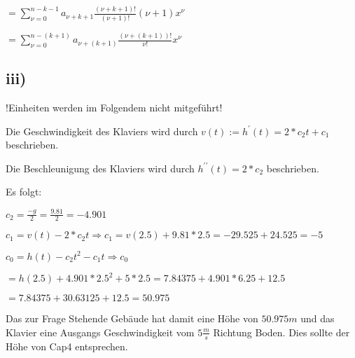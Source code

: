 $ = \sum\limits^{n-k-1}_{\nu=0} a_{\nu+k+1} \frac{(\nu+k+1)!}{(\nu+1)!} (\nu+1)x^{\nu}$

$ = \sum\limits^{n -(k+1)}_{\nu=0} a_{\nu+(k+1)} \frac{(\nu+(k+1))!}{\nu!} x^{\nu}$


\pagebreak
\subsection*{iii)}

\begin{large}
!Einheiten werden im Folgendem nicht mitgeführt!
\end{large}

Die Geschwindigkeit des Klaviers wird durch $v(t) := h^{\prime}(t) = 2 * c_{2}t + c_{1}$ beschrieben.

Die Beschleunigung des Klaviers wird durch $h^{\prime\prime}(t) = 2 * c_{2}$ beschrieben.

Es folgt:

$c_{2} = \frac{-g}{2} = \frac{9.81}{2} = -4.901 $

$c_{1} = v(t) - 2*c_{2}t \Longrightarrow c_{1} = v(2.5) + 9.81*2.5 = -29.525 + 24.525 = -5$

$c_{0} = h(t) - c_{2}t^{2} - c_{1}t \Longrightarrow c_{0}$

$= h(2.5) + 4.901 * 2.5^{2} + 5 * 2.5 = 7.84375 + 4.901 * 6.25 + 12.5$
 
$ = 7.84375 + 30.63125 + 12.5 = 50.975$

Das zur Frage Stehende Gebäude hat damit eine Höhe von $50.975m$ und das Klavier eine Ausgangs Geschwindigkeit vom $5\frac{m}{s}$ Richtung Boden.
Dies sollte der Höhe von Cap4 entsprechen.
       
 